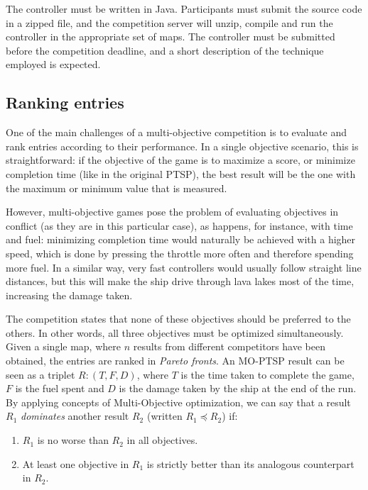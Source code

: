 \documentclass[conference]{IEEEtran}
\begin{document}
The controller must be written in Java. Participants must submit the source code in a zipped file, and the competition server will unzip, compile and run the controller in the appropriate set of maps. The controller must be submitted before the competition deadline, and a short description of the technique employed is expected.


\subsection{Ranking entries}

One of the main challenges of a multi-objective competition is to evaluate and rank entries according to their performance. In a single objective scenario, this is straightforward: if the objective of the game is to maximize a score, or minimize completion time (like in the original PTSP), the best result will be the one with the maximum or minimum value that is measured.

However, multi-objective games pose the problem of evaluating objectives in conflict (as they are in this particular case), as happens, for instance, with time and fuel: minimizing completion time would naturally be achieved with a higher speed, which is done by pressing the throttle more often and therefore spending more fuel. In a similar way, very fast controllers  would usually follow straight line distances, but this will make the ship drive through lava lakes most of the time, increasing the damage taken.

The competition states that none of these objectives should be preferred to the others. In other words, all three objectives must be optimized simultaneously. Given a single map, where $n$ results from different competitors have been obtained, the entries are ranked in \textit{Pareto fronts}. An MO-PTSP result can be seen as a triplet $R: (T, F, D)$, where $T$ is the time taken to complete the game, $F$ is the fuel spent and $D$ is the damage taken by the ship at the end of the run. By applying concepts of Multi-Objective optimization, we can say that a result $R_1$ \textit{dominates} another result $R_2$ (written $R_1 \preceq R_2$) if:

\begin{enumerate}
\item $R_1$ is no worse than $R_2$ in all objectives.
\item At least one objective in $R_1$ is strictly better than its analogous counterpart in $R_2$.
\end{enumerate}
\end{document}
